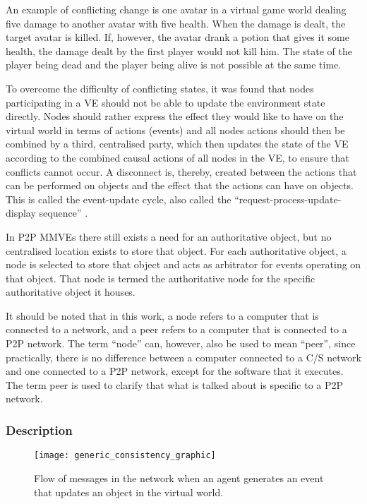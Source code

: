 An example of conflicting change is one avatar in a virtual game world dealing five damage to another avatar with five health. When the damage is dealt, the target avatar is killed. If, however, the avatar drank a potion that gives it some health, the damage dealt by the first player would not kill him. The state of the player being dead and the player being alive is not possible at the same time.

To overcome the difficulty of conflicting states, it was found that nodes participating in a VE should not be able to update the environment state directly. Nodes should rather express the effect they would like to have on the virtual world in terms of actions (events) and all nodes actions should then be combined by a third, centralised party, which then updates the state of the VE according to the combined causal actions of all nodes in the VE, to ensure that conflicts cannot occur. A disconnect is, thereby, created between the actions that can be performed on objects and the effect that the actions can have on objects. This is called the event-update cycle, also called the  ``request-process-update-display sequence'' \cite{Hu_voronoi_IM}.

In P2P MMVEs there still exists a need for an authoritative object, but no centralised location exists to store that object. For each authoritative object, a node is selected to store that object and acts as arbitrator for events operating on that object. That node is termed the authoritative node for the specific authoritative object it houses.

It should be noted that in this work, a node refers to a computer that is connected to a network, and a peer refers to a computer that is connected to a P2P network. The term ``node'' can, however, also be used to mean ``peer'', since  practically, there is no difference between a computer connected to a C/S network and one connected to a P2P network, except for the software that it executes. The term peer is used to clarify that what is talked about is specific to a P2P network.

\subsubsection{Description}

\begin{figure}[htbp]
 \centering
 \texttt{[image: generic\_consistency\_graphic]}
 \caption{Flow of messages in the network when an agent generates an event that updates an object in the virtual world.}
 \label{fig_event_update_flow_graphic}
\end{figure}

